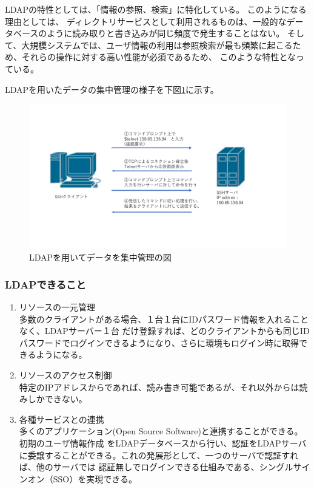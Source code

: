 \documentclass[11pt,a4j,titlepage]{jreport}
\begin{document}
LDAPの特性としては、「情報の参照、検索」に特化している。
このようになる理由としては、
ディレクトリサービスとして利用されるものは、一般的なデータベースのように読み取りと書き込みが同じ頻度で発生することはない。
そして、大規模システムでは、ユーザ情報の利用は参照検索が最も頻繁に起こるため、それらの操作に対する高い性能が必須であるため、
このような特性となっている。

LDAPを用いたデータの集中管理の様子を下図\ref{LDAP_data_manage}に示す。
\begin{figure}[h]
    \centering
    \includegraphics[width=1.0\textwidth, page=10]{graphs/network_archtecture.pdf}
    \caption{LDAPを用いてデータを集中管理の図}
    \label{LDAP_data_manage}
\end{figure}


\subsubsection*{LDAPできること}
\begin{enumerate}
    \setlength{\parskip}{0.05cm} %
    \setlength{\itemsep}{0.05cm}
    \item リソースの一元管理\mbox{}\\多数のクライアントがある場合、１台１台にIDパスワード情報を入れることなく、LDAPサーバー１台
だけ登録すれば、どのクライアントからも同じIDパスワードでログインできるようになり、さらに環境もログイン時に取得できるようになる。


    \item リソースのアクセス制御\mbox{}\\特定のIPアドレスからであれば、読み書き可能であるが、それ以外からは読みしかできない。
    \item 各種サービスとの連携\mbox{}\\多くのアプリケーション(Open Source Software)と連携することができる。初期のユーザ情報作成
をLDAPデータベースから行い、認証をLDAPサーバに委譲することができる。これの発展形として、一つのサーバで認証すれば、他のサーバでは
認証無しでログインできる仕組みである、シングルサインオン（SSO）を実現できる。
\end{enumerate}
\end{document}
